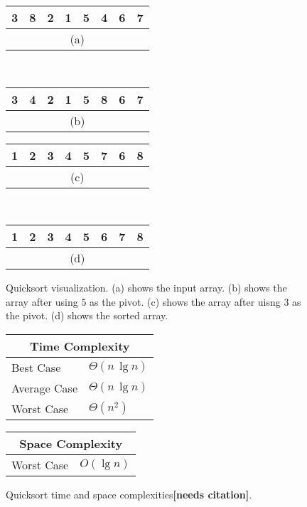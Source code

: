\begin{figure}[!ht]
    \centering
    \begin{tabular}{|c|c|c|c|c|c|c|c|}
    \hline
    3 & 8 & 2 & 1 & \cellcolor{lightgray}5 & 4 & 6 & 7 \\
    \hline
    \multicolumn{8}{c}{(a)} \\
    \end{tabular}
    \,
    \begin{tabular}{|c|c|c|c|c|c|c|c|}
    \hline
    3 & 4 & \cellcolor{lightgray}2 & 1 & 5 & 8 & 6 & 7 \\
    \hline
    \multicolumn{8}{c}{(b)} \\
    \end{tabular}
    \break
    \begin{tabular}{|c|c|c|c|c|c|c|c|}
    \hline
    1 & 2 & \cellcolor{lightgray}3 & 4 & 5 & 7 & 6 & 8 \\
    \hline
    \multicolumn{8}{c}{(c)} \\
    \end{tabular}
    \,
    \begin{tabular}{|c|c|c|c|c|c|c|c|}
    \hline
    1 & 2 & 3 & 4 & 5 & 6 & 7 & 8 \\
    \hline
    \multicolumn{8}{c}{(d)} \\
    \end{tabular}
    
    \caption{Quicksort visualization. (a) shows the input array. (b) shows the array after using $5$ as the pivot. (c) shows the array after uisng 3 as the pivot. (d) shows the sorted array.}
    \label{fig:quicksort_ex}
\end{figure}

\begin{figure}[!ht]
    \centering
    \begin{tabular}{l|l}
    \multicolumn{2}{c}{\textbf{Time Complexity}} \\
    \hline
    Best Case    & $\Theta(n \, \lg n)$ \\
    Average Case & $\Theta(n \, \lg n)$ \\
    Worst Case   & $\Theta(n^2)$ \\
    \end{tabular}
    \quad\quad
    \begin{tabular}{l|l}
    \multicolumn{2}{c}{\textbf{Space Complexity}} \\
    \hline
    Worst Case   & $O(\lg n)$
    \end{tabular}
    
    \caption{Quicksort time\cite{clrs2009} and space complexities\textbf{[needs citation]}.}
    \label{fig:quicksort}
\end{figure}


